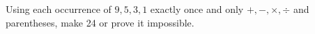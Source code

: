 Using each occurrence of $9,5,3,1$ exactly once and only $+,-,\times,\div$ and parentheses, make 24 or prove it impossible.
